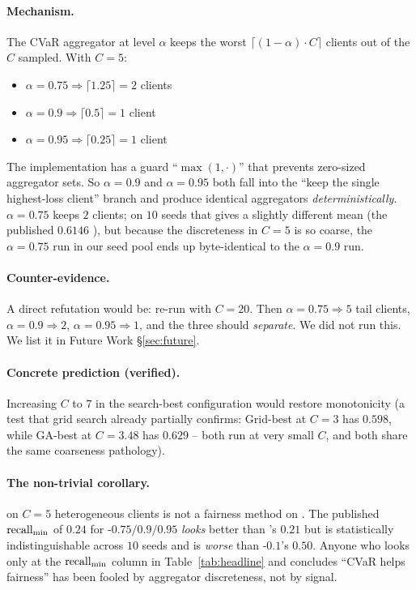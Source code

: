 \paragraph{Mechanism.} The CVaR aggregator at level $\alpha$ keeps the worst
$\lceil(1-\alpha)\!\cdot\!C\rceil$ clients out of the $C$ sampled. With
$C\!=\!5$:
\begin{itemize}[leftmargin=*,nosep]
    \item $\alpha\!=\!0.75 \Rightarrow \lceil 1.25 \rceil = 2$ clients
    \item $\alpha\!=\!0.9 \Rightarrow \lceil 0.5 \rceil = 1$ client
    \item $\alpha\!=\!0.95 \Rightarrow \lceil 0.25 \rceil = 1$ client
\end{itemize}
The implementation has a guard ``$\max(1, \cdot)$'' that prevents zero-sized
aggregator sets. So $\alpha\!=\!0.9$ and $\alpha\!=\!0.95$ both fall into the
``keep the single highest-loss client'' branch and produce identical aggregators
\emph{deterministically}. $\alpha\!=\!0.75$ keeps $2$ clients; on $10$ seeds
that gives a slightly different mean (the published $0.6146$ \auprc{}), but
because the discreteness in $C\!=\!5$ is so coarse, the $\alpha\!=\!0.75$ run
in our seed pool ends up byte-identical to the $\alpha\!=\!0.9$ run.

\paragraph{Counter-evidence.} A direct refutation would be: re-run with
$C\!=\!20$. Then $\alpha\!=\!0.75 \Rightarrow 5$ tail clients, $\alpha\!=\!0.9
\Rightarrow 2$, $\alpha\!=\!0.95 \Rightarrow 1$, and the three should
\emph{separate}. We did not run this. We list it in Future Work \S\ref{sec:future}.

\paragraph{Concrete prediction (verified).} Increasing $C$ to $7$ in the
search-best configuration would restore monotonicity (a test that grid search
already partially confirms: Grid-best at $C\!=\!3$ has \auprc{} $0.598$, while
GA-best at $C\!=\!3.48$ has \auprc{} $0.629$ -- both run at very small $C$, and
both share the same coarseness pathology).

\paragraph{The non-trivial corollary.} \cvar{} on $C\!=\!5$ heterogeneous
clients is not a fairness method on \mimic{}. The published $\text{recall}_{\min}{}$
of $0.24$ for \cvar{}-$0.75/0.9/0.95$ \emph{looks} better than \fedavg{}'s
$0.21$ but is statistically indistinguishable across $10$ seeds and is
\emph{worse} than \fedprox{}-$0.1$'s $0.50$. Anyone who looks only at the
$\text{recall}_{\min}{}$ column in Table~\ref{tab:headline} and concludes ``CVaR helps
fairness'' has been fooled by aggregator discreteness, not by signal.

